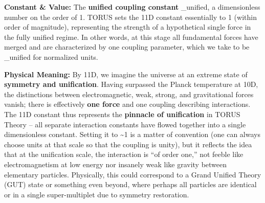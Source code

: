 \documentclass[
]{article}
\begin{document}
{\textbf{Constant \& Value:} The \textbf{unified coupling constant}
\alpha_{unified}, a
dimensionless number on the order of 1\hspace{0pt}. TORUS sets the 11D
constant essentially to 1 (within order of magnitude), representing the
strength of a hypothetical single force in the fully unified regime. In
other words, at this stage all fundamental forces have merged and are
characterized by one coupling parameter, which we take to be \alpha\_unified
 for normalized units.

\textbf{Physical Meaning:} By 11D, we imagine the universe at an extreme
state of \textbf{symmetry and unification}. Having surpassed the Planck
temperature at 10D, the distinctions between electromagnetic, weak,
strong, and gravitational forces vanish; there is effectively
\textbf{one force} and one coupling describing interactions\hspace{0pt}.
The 11D constant thus represents the \textbf{pinnacle of unification} in
TORUS Theory -- all separate interaction constants have flowed together
into a single dimensionless constant. Setting it to \textasciitilde1 is
a matter of convention (one can always choose units at that scale so
that the coupling is unity), but it reflects the idea that at the
unification scale, the interaction is ``of order one,'' not feeble like
electromagnetism at low energy nor insanely weak like gravity between
elementary particles. Physically, this could correspond to a Grand
Unified Theory (GUT) state or something even beyond, where perhaps all
particles are identical or in a single super-multiplet due to symmetry
restoration\hspace{0pt}.

}
\end{document}
